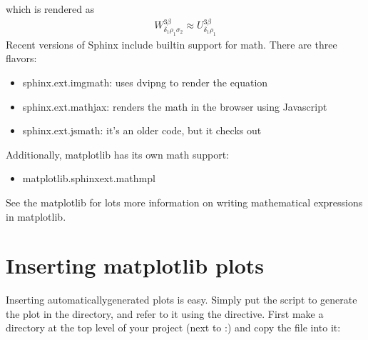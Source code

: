 \documentclass[letterpaper,10pt,english]{sphinxmanual}
\begin{document}
\begin{sphinxVerbatim}[commandchars=\\\{\}]
 

  \PYGZbs{}\PYGZbs{} \PYGZbs{} \PYGZbs{} \PYGZbs{} \PYGZbs{}\PYGZbs{} \PYGZbs{}
\end{sphinxVerbatim}

\sphinxAtStartPar
which is rendered as
\begin{equation*}
\begin{split}W^{3\beta}_{\delta_1 \rho_1 \sigma_2} \approx U^{3\beta}_{\delta_1 \rho_1}\end{split}
\end{equation*}
\sphinxAtStartPar
Recent versions of Sphinx include built\sphinxhyphen{}in support for math.
There are three flavors:
\begin{itemize}
\item {} 
\sphinxAtStartPar
sphinx.ext.imgmath: uses dvipng to render the equation

\item {} 
\sphinxAtStartPar
sphinx.ext.mathjax: renders the math in the browser using Javascript

\item {} 
\sphinxAtStartPar
sphinx.ext.jsmath: it’s an older code, but it checks out

\end{itemize}

\sphinxAtStartPar
Additionally, matplotlib has its own math support:
\begin{itemize}
\item {} 
\sphinxAtStartPar
matplotlib.sphinxext.mathmpl

\end{itemize}

\sphinxAtStartPar
See the matplotlib  for lots
more information on writing mathematical expressions in matplotlib.


\section{Inserting matplotlib plots}
\label{\detokenize{chapter2:inserting-matplotlib-plots}}\label{\detokenize{chapter2:pyplots}}
\sphinxAtStartPar
Inserting automatically\sphinxhyphen{}generated plots is easy.  Simply put the
script to generate the plot in the  directory, and
refer to it using the  directive.  First make a
 directory at the top level of your project (next to
:) and copy the  file into it:
\end{document}
